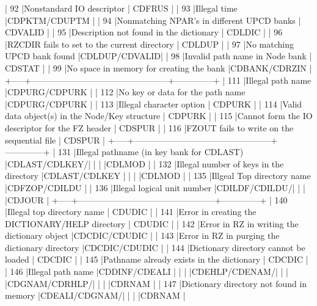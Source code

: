 \begin{XMP}
 |  92 |Nonstandard IO descriptor                       |   CDFRUS     |
 |  93 |Illegal time                                    |CDPKTM/CDUPTM |
 |  94 |Nonmatching NPAR's in different UPCD banks      |   CDVALID    |
 |  95 |Description not found in the dictionary         |   CDLDIC     |
 |  96 |RZCDIR fails to set to the current directory    |   CDLDUP     |
 |  97 |No matching UPCD bank found                     |CDLDUP/CDVALID|
 |  98 |Invalid path name in Node bank                  |   CDSTAT     |
 |  99 |No space in memory for creating the bank        |CDBANK/CDRZIN |
 +-----+------------------------------------------------+--------------+
 | 111 |Illegal path name                               |CDPURG/CDPURK |
 | 112 |No key or data for the path name                |CDPURG/CDPURK |
 | 113 |Illegal character option                        |   CDPURK     |
 | 114 |Valid data object(s) in the Node/Key structure  |   CDPURK     |
 | 115 |Cannot form the IO descriptor for the FZ header |   CDSPUR     |
 | 116 |FZOUT fails to write on the sequential file     |   CDSPUR     |
 +-----+------------------------------------------------+--------------+
 | 131 |Illegal pathname (in key bank for CDLAST)       |CDLAST/CDLKEY/|
 |     |                                                |CDLMOD        |
 | 132 |Illegal number of keys in the directory         |CDLAST/CDLKEY |
 |     |                                                |CDLMOD        |
 | 135 |Illgeal Top directory name                      |CDFZOP/CDILDU |
 | 136 |Illegal logical unit number                     |CDILDF/CDILDU/|
 |     |                                                |CDJOUR        |
 +-----+------------------------------------------------+--------------+
 | 140 |Illegal top directory name                      |   CDUDIC     |
 | 141 |Error in creating the DICTIONARY/HELP directory |   CDUDIC     |
 | 142 |Error in RZ in writing the dictionary object    |CDCDIC/CDUDIC |
 | 143 |Error in RZ in purging the dictionary directory |CDCDIC/CDUDIC |
 | 144 |Dictionary directory cannot be loaded           |   CDCDIC     |
 | 145 |Pathname already exists in the dictionary       |   CDCDIC     |
 | 146 |Illegal path name                               |CDDINF/CDEALI |
 |     |                                                |CDEHLP/CDENAM/|
 |     |                                                |CDGNAM/CDRHLP/|
 |     |                                                |CDRNAM        |
 | 147 |Dictionary directory not found in memory        |CDEALI/CDGNAM/|
 |     |                                                |CDRNAM        |

\end{XMP}

